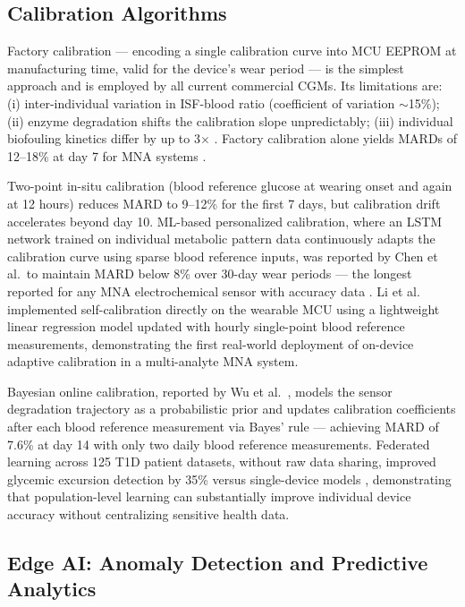 \documentclass[review,1p]{elsarticle}
\begin{document}
\subsection{Calibration Algorithms}
\label{subsec:calibration}

Factory calibration — encoding a single calibration curve into MCU EEPROM at manufacturing time, valid for the device's wear period — is the simplest approach and is employed by all current commercial CGMs. Its limitations are: (i) inter-individual variation in ISF-blood ratio (coefficient of variation $\sim$15\%); (ii) enzyme degradation shifts the calibration slope unpredictably; (iii) individual biofouling kinetics differ by up to 3$\times$ \cite{Chen2023LSTM}. Factory calibration alone yields MARDs of 12--18\% at day 7 for MNA systems \cite{Yang2023CGM14day}.

Two-point in-situ calibration (blood reference glucose at wearing onset and again at 12 hours) reduces MARD to 9--12\% for the first 7 days, but calibration drift accelerates beyond day 10. ML-based personalized calibration, where an LSTM network trained on individual metabolic pattern data continuously adapts the calibration curve using sparse blood reference inputs, was reported by Chen et al.\ to maintain MARD below 8\% over 30-day wear periods — the longest reported for any MNA electrochemical sensor with accuracy data \cite{Chen2023LSTM}. Li et al.\ \cite{Li2025Innovation} implemented self-calibration directly on the wearable MCU using a lightweight linear regression model updated with hourly single-point blood reference measurements, demonstrating the first real-world deployment of on-device adaptive calibration in a multi-analyte MNA system.

Bayesian online calibration, reported by Wu et al.\ \cite{Wu2024Bayesian}, models the sensor degradation trajectory as a probabilistic prior and updates calibration coefficients after each blood reference measurement via Bayes' rule — achieving MARD of 7.6\% at day 14 with only two daily blood reference measurements. Federated learning across 125 T1D patient datasets, without raw data sharing, improved glycemic excursion detection by 35\% versus single-device models \cite{Darpit2025FL}, demonstrating that population-level learning can substantially improve individual device accuracy without centralizing sensitive health data.

\subsection{Edge AI: Anomaly Detection and Predictive Analytics}
\label{subsec:edge_ai}
\end{document}
